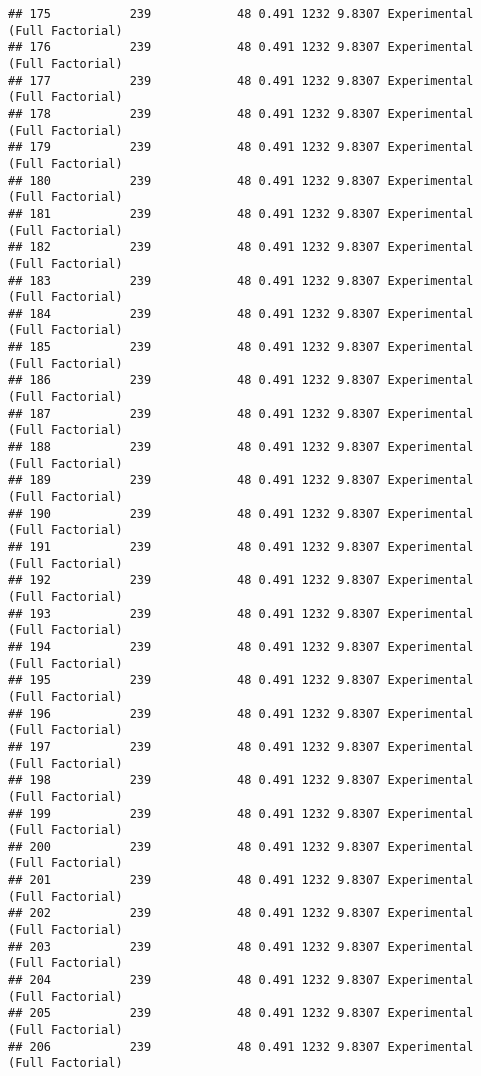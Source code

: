 \documentclass[]{article}
\begin{document}
\begin{verbatim}
## 175           239            48 0.491 1232 9.8307 Experimental (Full Factorial)
## 176           239            48 0.491 1232 9.8307 Experimental (Full Factorial)
## 177           239            48 0.491 1232 9.8307 Experimental (Full Factorial)
## 178           239            48 0.491 1232 9.8307 Experimental (Full Factorial)
## 179           239            48 0.491 1232 9.8307 Experimental (Full Factorial)
## 180           239            48 0.491 1232 9.8307 Experimental (Full Factorial)
## 181           239            48 0.491 1232 9.8307 Experimental (Full Factorial)
## 182           239            48 0.491 1232 9.8307 Experimental (Full Factorial)
## 183           239            48 0.491 1232 9.8307 Experimental (Full Factorial)
## 184           239            48 0.491 1232 9.8307 Experimental (Full Factorial)
## 185           239            48 0.491 1232 9.8307 Experimental (Full Factorial)
## 186           239            48 0.491 1232 9.8307 Experimental (Full Factorial)
## 187           239            48 0.491 1232 9.8307 Experimental (Full Factorial)
## 188           239            48 0.491 1232 9.8307 Experimental (Full Factorial)
## 189           239            48 0.491 1232 9.8307 Experimental (Full Factorial)
## 190           239            48 0.491 1232 9.8307 Experimental (Full Factorial)
## 191           239            48 0.491 1232 9.8307 Experimental (Full Factorial)
## 192           239            48 0.491 1232 9.8307 Experimental (Full Factorial)
## 193           239            48 0.491 1232 9.8307 Experimental (Full Factorial)
## 194           239            48 0.491 1232 9.8307 Experimental (Full Factorial)
## 195           239            48 0.491 1232 9.8307 Experimental (Full Factorial)
## 196           239            48 0.491 1232 9.8307 Experimental (Full Factorial)
## 197           239            48 0.491 1232 9.8307 Experimental (Full Factorial)
## 198           239            48 0.491 1232 9.8307 Experimental (Full Factorial)
## 199           239            48 0.491 1232 9.8307 Experimental (Full Factorial)
## 200           239            48 0.491 1232 9.8307 Experimental (Full Factorial)
## 201           239            48 0.491 1232 9.8307 Experimental (Full Factorial)
## 202           239            48 0.491 1232 9.8307 Experimental (Full Factorial)
## 203           239            48 0.491 1232 9.8307 Experimental (Full Factorial)
## 204           239            48 0.491 1232 9.8307 Experimental (Full Factorial)
## 205           239            48 0.491 1232 9.8307 Experimental (Full Factorial)
## 206           239            48 0.491 1232 9.8307 Experimental (Full Factorial)

\end{verbatim}
\end{document}

